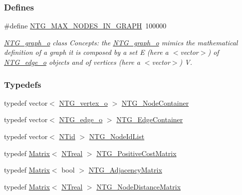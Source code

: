 \subsubsection*{Defines}
\begin{DoxyCompactItemize}
\item 
\#define \hyperlink{ntg__graph__obj_8h_a07e4172ed3953fb590c6ab6944ed7449}{NTG\_\-MAX\_\-NODES\_\-IN\_\-GRAPH}~100000
\begin{DoxyCompactList}\small\item\em \hyperlink{class_n_t_g__graph__o}{NTG\_\-graph\_\-o} class Concepts: the \hyperlink{class_n_t_g__graph__o}{NTG\_\-graph\_\-o} mimics the mathematical definition of a graph it is composed by a set E (here a $<$vector$>$) of \hyperlink{class_n_t_g__edge__o}{NTG\_\-edge\_\-o} objects and of vertices (here a $<$vector$>$) V. \item\end{DoxyCompactList}\end{DoxyCompactItemize}
\subsubsection*{Typedefs}
\begin{DoxyCompactItemize}
\item 
typedef vector$<$ \hyperlink{class_n_t_g__vertex__o}{NTG\_\-vertex\_\-o} $>$ \hyperlink{ntg__graph__obj_8h_a340769ac683177868657a3a581341038}{NTG\_\-NodeContainer}
\item 
typedef vector$<$ \hyperlink{class_n_t_g__edge__o}{NTG\_\-edge\_\-o} $>$ \hyperlink{ntg__graph__obj_8h_a8b20c3ac567fe3422004ba5a14def650}{NTG\_\-EdgeContainer}
\item 
typedef vector$<$ \hyperlink{nt__types_8h_ab5cab5f78fdd2211c340cbe527a4afd7}{NTid} $>$ \hyperlink{ntg__graph__obj_8h_a589ab3be7065e1ceabfbecb775d71349}{NTG\_\-NodeIdList}
\item 
typedef \hyperlink{class_t_n_t_1_1_matrix}{Matrix}$<$ \hyperlink{nt__types_8h_a814a97893e9deb1eedcc7604529ba80d}{NTreal} $>$ \hyperlink{ntg__graph__obj_8h_ae7f051968e740ba1cbb6259282637dc5}{NTG\_\-PositiveCostMatrix}
\item 
typedef \hyperlink{class_t_n_t_1_1_matrix}{Matrix}$<$ bool $>$ \hyperlink{ntg__graph__obj_8h_a83971ea41a2abf96cc68fdc39bd92988}{NTG\_\-AdjacencyMatrix}
\item 
typedef \hyperlink{class_t_n_t_1_1_matrix}{Matrix}$<$ \hyperlink{nt__types_8h_a814a97893e9deb1eedcc7604529ba80d}{NTreal} $>$ \hyperlink{ntg__graph__obj_8h_a4d7cda245cf404eab8192f330fb14c8a}{NTG\_\-NodeDistanceMatrix}
\end{DoxyCompactItemize}
